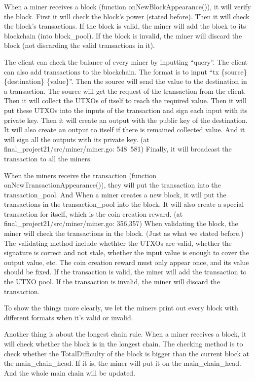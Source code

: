\documentclass[12pt]{article}
\begin{document}
When a miner receives a block (function onNewBlockAppearance()), it will verify the block. 
First it will check the block's power (stated before). Then it will check the block's transactions.
If the block is valid, the miner will add the block to its blockchain (into block\_pool). If the block is invalid, the miner will discard the block (not discarding the valid transactions in it).

The client can check the balance of every miner by inputting ``query''.
The client can also add transactions to the blockchain. The format is to input ``tx \{source\} \{destination\} \{value\}''. Then the source will send the value to the destination in a transaction.
The source will get the request of the transaction from the client. Then it will collect the UTXOs of itself to reach the required value. 
Then it will put these UTXOs into the inputs of the transaction and sign each input with its private key.
Then it will create an output with the public key of the destination. It will also create an output to itself if there is remained collected value.
And it will sign all the outputs with its private key. (at final\_project21/src/miner/miner.go: 548~581)
Finally, it will broadcast the transaction to all the miners.

When the miners receive the transaction (function onNewTransactionAppearance()), they will put the transaction into the transaction\_pool. And When a miner creates a new block, it will put the transactions in the transaction\_pool into the block.
It will also create a special transaction for itself, which is the coin creation reward. (at final\_project21/src/miner/miner.go: 356,357) 
When validating the block, the miner will check the transactions in the block. (Just as what we stated before.) The validating method include whethter the UTXOs are valid, whether the signature is correct and not stale, whether the input value is enough to cover the output value, etc. 
The coin creation reward must only appear once, and its value should be fixed.
If the transaction is valid, the miner will add the transaction to the UTXO pool. If the transaction is invalid, the miner will discard the transaction.

To show the things more clearly, we let the miners print out every block with different formats when it's valid or invalid. 

Another thing is about the longest chain rule. When a miner receives a block, it will check whether the block is in the longest chain. 
The checking method is to check whether the TotalDifficulty of the block is bigger than the current block at the main\_chain\_head. If it is, the miner will put it on the main\_chain\_head. And the whole main chain will be updated.
\end{document}
